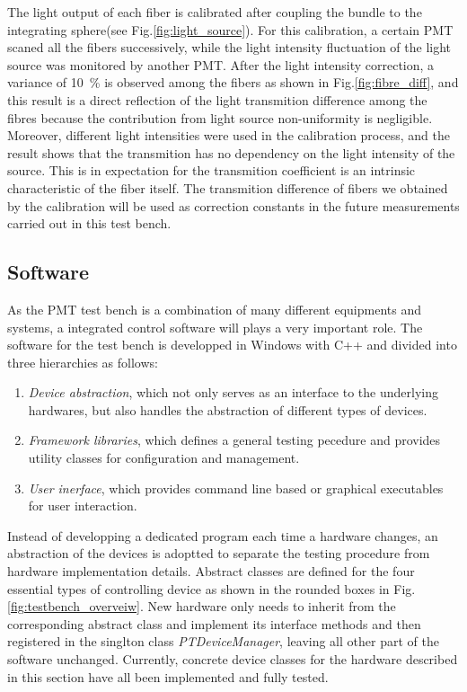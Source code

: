 \documentclass[5p, times]{elsarticle}
\begin{document}
The light output of each fiber is calibrated after coupling the bundle to the integrating sphere(see Fig.\ref{fig:light_source}).
For this calibration, a certain PMT scaned all the fibers successively, while the light intensity fluctuation of the light source was monitored by another PMT.
After the light intensity correction, a variance of \SI{10}{\percent} is observed among the fibers as shown in Fig.\ref{fig:fibre_diff}, and this result is a direct reflection of the light transmition difference among the fibres because the contribution from light source non-uniformity is negligible.
Moreover, different light intensities were used in the calibration process, and the result shows that the transmition has no dependency on the light intensity of the source. 
This is in expectation for the transmition coefficient is an intrinsic characteristic of the fiber itself.
The transmition difference of fibers we obtained by the calibration will be used as correction constants in the future measurements carried out in this test bench.

\subsection{Software}
\label{sec:software}

As the PMT test bench is a combination of many different equipments and systems, a integrated control software will plays a very important role. The software for the test bench is developped in Windows with C++ and divided into three hierarchies as follows:
\begin{enumerate}
 \item \textit{Device abstraction}, which not only serves as an interface to the underlying hardwares, but also handles the abstraction of different types of devices. 
 \item \textit{Framework libraries}, which defines a general testing pecedure and provides utility classes for configuration and management.
 \item \textit{User inerface}, which provides command line based or graphical executables for user interaction. 
\end{enumerate}

Instead of developping a dedicated program each time a hardware changes, an abstraction of the devices is adoptted to separate the testing procedure from hardware implementation details. 
Abstract classes are defined for the four essential types of controlling device as shown in the rounded boxes in Fig.\ref{fig:testbench_overveiw}.
New hardware only needs to inherit from the corresponding abstract class and implement its interface methods and then registered in the singlton class \textit{PTDeviceManager}, leaving all other part of the software unchanged.
Currently, concrete device classes for the hardware described in this section have all been implemented and fully tested.
\end{document}
